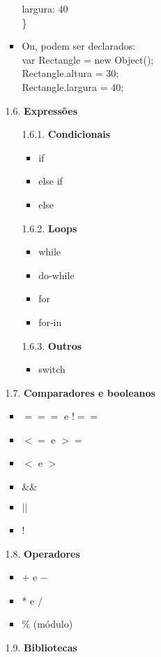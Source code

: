 \documentclass[12pt, a4paper]{article} %
\begin{document}
\begin{enumerate}
\begin{enumerate}
\begin{itemize}
\setlength{\parindent}{1cm} largura: 40 \\
\}
\item Ou, podem ser declarados:\\
var Rectangle = new Object(); \\
Rectangle.altura = 30; \\
Rectangle.largura = 40; \\
\end{itemize}
\item[1.6.] \textbf{Expressões}
\begin{enumerate}
\item[1.6.1.] \textbf{Condicionais}
\begin{itemize}
\item if
\item else if
\item else
\end{itemize}
\item[1.6.2.] \textbf{Loops}
\begin{itemize}
\item while
\item do-while
\item for
\item for-in
\end{itemize}
\item[1.6.3.] \textbf{Outros}
\begin{itemize}
\item switch
\end{itemize}
\end{enumerate}
\item[1.7.] \textbf{Comparadores e booleanos}
\begin{itemize}
\item $===$ e !$==$
\item $<=$ e $>=$
\item $<$ e $>$
\item $\&\&$
\item $||$
\item  !
\end{itemize}
\item[1.8.] \textbf{Operadores}
\begin{itemize}
\item $+$ e $-$
\item * e /
\item \% (módulo)
\end{itemize}
\item[1.9.] \textbf{Bibliotecas}
\begin{itemize}

\end{itemize}
\end{enumerate}
\end{enumerate}
\end{document}
